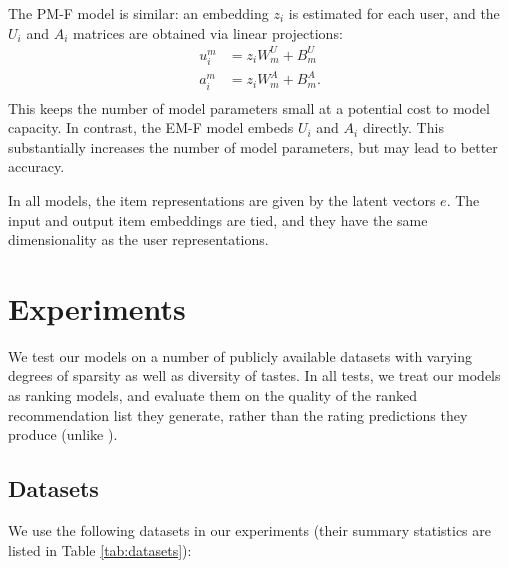 \documentclass[sigconf]{acmart}
\begin{document}
The PM-F model is similar: an embedding $z_i$ is estimated for each user, and the $U_i$ and $A_i$ matrices are obtained via linear projections:
\begin{equation}
\begin{aligned}
  u^m_{i} &= z_{i}W^U_m + B^U_m\\
  a^m_{i} &= z_{i}W^A_m + B^A_m.\\
\end{aligned}
\end{equation}
This keeps the number of model parameters small at a potential cost to model capacity. In contrast, the EM-F model embeds $U_i$ and $A_i$ directly. This substantially increases the number of model parameters, but may lead to better accuracy.

In all models, the item representations are given by the latent vectors $e$. The input and output item embeddings are tied, and they have the same dimensionality as the user representations.

\section{Experiments}
We test our models on a number of publicly available datasets with varying degrees of sparsity as well as diversity of tastes. In all tests, we treat our models as ranking models, and evaluate them on the quality of the ranked recommendation list they generate, rather than the rating predictions they produce (unlike \cite{wu2017recurrent}).


\subsection{Datasets}
We use the following datasets in our experiments (their summary statistics are listed in Table \ref{tab:datasets}):
\end{document}
